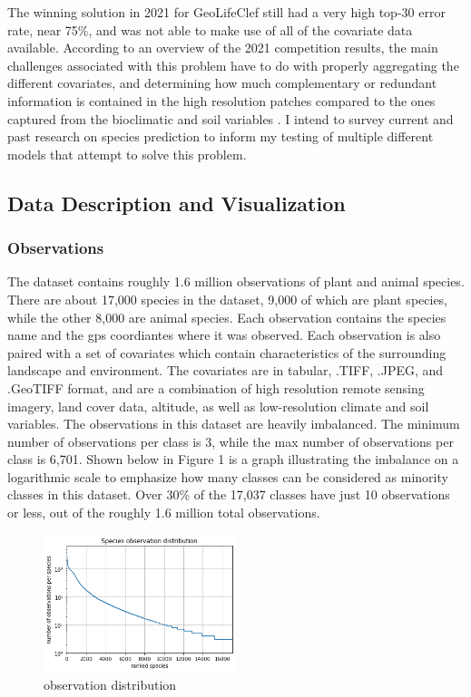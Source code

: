 \documentclass[12pt, oneside]{article}
\begin{document}
\begin{normalsize}
The winning solution in 2021 for GeoLifeClef still had a very high top-30 error rate, near 75\%, and was not able to make use of all of the covariate data available. According to an overview of the 2021 competition results, the main challenges associated with this problem have to do with properly aggregating the different covariates, and determining how much complementary or redundant information is contained in the high resolution patches compared to the ones captured from the bioclimatic and soil variables \cite{lorieul2021overview}. I intend to survey current and past research on species prediction to inform my testing of multiple different models that attempt to solve this problem. 

\subsection{Data Description and Visualization}

\subsubsection{Observations}

The dataset contains roughly 1.6 million observations of plant and animal species. There are about 17,000 species in the dataset, 9,000 of which are plant species, while the other 8,000 are animal species. Each observation contains the species name and the gps coordiantes where it was observed. Each observation is also paired with a set of covariates which contain characteristics of the surrounding landscape and environment. The covariates are in tabular, .TIFF, .JPEG, and .GeoTIFF format, and are a combination of high resolution remote sensing imagery, land cover data, altitude, as well as low-resolution climate and soil variables. The observations in this dataset are heavily imbalanced. The minimum number of observations per class is 3, while the max number of observations per class is 6,701. Shown below in Figure 1 is a graph illustrating the imbalance on a logarithmic scale to emphasize how many classes can be considered as minority classes in this dataset. Over 30\% of the 17,037 classes have just 10 observations or less, out of the roughly 1.6 million total observations.

\begin{figure}[H]
\caption{observation distribution}
\centering
\includegraphics[width=0.5\textwidth]{observations}
\end{figure}


\end{normalsize}
\end{document}
